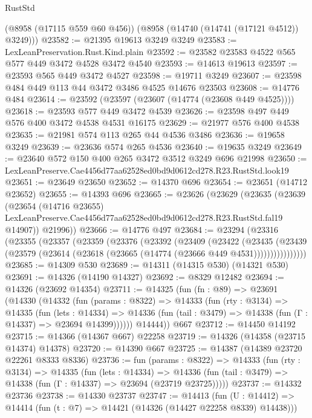 \begin{lexlean}{RustStd}
\begin{coremodule}
      (@8958 (@17115 @559 @60 @456))
      (@8958 (@14740 (@14741 (@17121 @4512)) @3249)))
@23582 := @21395 @19613 @3249 @3249
@23583 := LexLeanPreservation.Rust.Kind.plain
@23592 := @23582 @23583 @4522 @565 @577 @449 @3472 @4528 @3472 @4540
@23593 := @14613 @19613
@23597 := @23593 @565 @449 @3472 @4527
@23598 := @19711 @3249
@23607 := @23598 @484 @449 @113 @44 @3472 @3486 @4525 @14676 @23503
@23608 := @14776 @484
@23614 := @23592 (@23597 (@23607 (@14774 (@23608 @449 @4525))))
@23618 := @23593 @577 @449 @3472 @4539
@23626 := @23598 @497 @449 @576 @400 @3472 @4538 @4531 @16175
@23629 := @21977 @576 @400 @4538
@23635 := @21981 @574 @113 @265 @44 @4536 @3486
@23636 := @19658 @3249
@23639 := @23636 @574 @265 @4536
@23640 := @19635 @3249
@23649 := @23640 @572 @150 @400 @265 @3472 @3512 @3249 @696 @21998
@23650 := LexLeanPreserve.Cae4456d77aa62528ed0bd9d0612cd278.R23.RustStd.look19
@23651 := @23649 @23650
@23652 := @14370 @696
@23654 := @23651 (@14712 @23652)
@23655 := @14393 @696
@23665 := @23626
    (@23629
      (@23635
        (@23639
          (@23654
            (@14716 @23655)
            LexLeanPreserve.Cae4456d77aa62528ed0bd9d0612cd278.R23.RustStd.fal19
            @14907))
        @21996))
@23666 := @14776 @497
@23684 := @23294
    (@23316
      (@23355
        (@23357
          (@23359
            (@23376
              (@23392
                (@23409
                  (@23422
                    (@23435
                      (@23439
                        (@23579 (@23614 (@23618 (@23665 (@14774 (@23666 @449 @4531))))))))))))))))
@23685 := @14309 @530
@23689 := @14311 (@14315 @530) (@14321 @530)
@23691 := @14326 (@14190 @14327)
@23692 := @8329 @12482
@23694 := @14326 (@23692 @14354)
@23711 := @14325
    (fun (fn : @89) =>
    @23691
      (@14330
        (@14332
          (fun (params : @8322) =>
          @14333
            (fun (rty : @3134) =>
            @14335
              (fun (lets : @14334) =>
              @14336 (fun (tail : @3479) => @14338 (fun (Γ : @14337) => @23694 @14399))))))
        @14444))
    @667
@23712 := @14450 @14192
@23715 := @14366 (@14367 @667) @22258
@23719 := @14326 (@14358 (@23715 @14374) @14378)
@23720 := @14390 @667
@23725 := @14387 (@14389 @23720 @22261 @8333 @8336)
@23736 := fun (params : @8322) =>
  @14333
    (fun (rty : @3134) =>
    @14335
      (fun (lets : @14334) =>
      @14336 (fun (tail : @3479) => @14338 (fun (Γ : @14337) => @23694 (@23719 @23725)))))
@23737 := @14332 @23736
@23738 := @14330 @23737
@23747 := @14413
    (fun (U : @14412) => @14414 (fun (t : @7) => @14421 (@14326 (@14427 @22258 @8339) @14438)))

\end{coremodule}
\end{lexlean}
